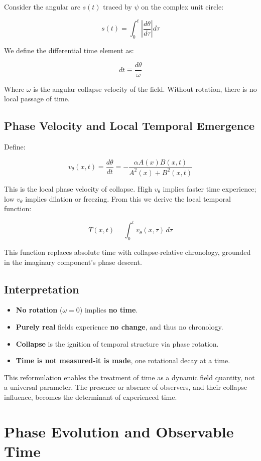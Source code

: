 Consider the angular arc $s(t)$ traced by $\psi$ on the complex unit circle:

\[
s(t) = \int_0^t \left| \frac{d\theta}{d\tau} \right| d\tau
\]

We define the differential time element as:

\[
dt \equiv \frac{d\theta}{\omega}
\]

Where $\omega$ is the angular collapse velocity of the field. \cite{chapter_time} Without rotation, there is no local passage of time. \cite{chapter_time} 


\subsection*{Phase Velocity and Local Temporal Emergence}

Define:

\[
v_\theta(x,t) = \frac{d\theta}{dt} = -\frac{\alpha A(x) B(x,t)}{A^2(x) + B^2(x,t)}
\]

This is the local phase velocity of collapse. \cite{chapter_time} High $v_\theta$ implies faster time experience; low $v_\theta$ implies dilation or freezing. \cite{chapter_time} From this we derive the local temporal function:

\[
T(x, t) = \int_0^t v_\theta(x, \tau) \, d\tau
\]

This function replaces absolute time with collapse-relative chronology, grounded in the imaginary component’s phase descent. \cite{chapter_time} \subsection*{Interpretation}

\begin{itemize}
  \item \textbf{No rotation} ($\omega = 0$) implies \textbf{no time}. \cite{chapter_time} \item \textbf{Purely real} fields experience \textbf{no change}, and thus no chronology. \item \textbf{Collapse} is the ignition of temporal structure via phase rotation. \item \textbf{Time is not measured-it is made}, one rotational decay at a time. \cite{chapter_time} \end{itemize}

This reformulation enables the treatment of time as a dynamic field quantity, not a universal parameter. \cite{chapter_time} The presence or absence of observers, and their collapse influence, becomes the determinant of experienced time. \cite{chapter_time} \section{Phase Evolution and Observable Time}

